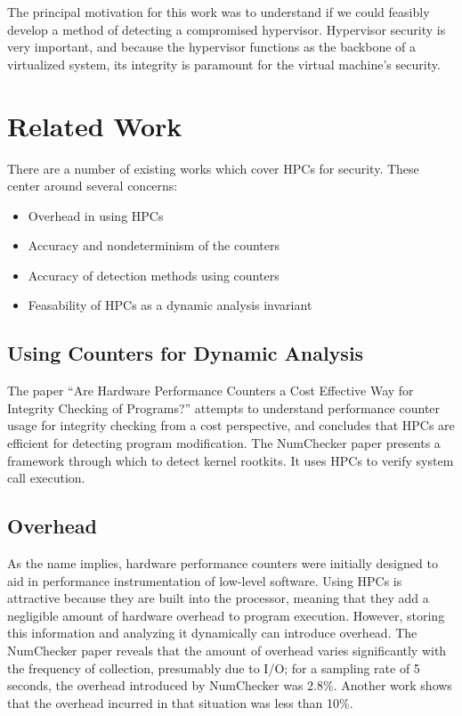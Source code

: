 \documentclass[notitlepage]{article}
\begin{document}
The principal motivation for this work was to understand if we could feasibly
develop a method of detecting a compromised hypervisor. Hypervisor security is
very important, and because the hypervisor functions as the backbone of a
virtualized system, its integrity is paramount for the virtual machine's
security.


\section{Related Work}
\label{sec:related}
There are a number of existing works which cover HPCs for security. These center
around several concerns:
\begin{itemize}
    \item Overhead in using HPCs
    \item Accuracy and nondeterminism of the counters
    \item Accuracy of detection methods using counters
    \item Feasability of HPCs as a dynamic analysis invariant
\end{itemize}

\subsection{Using Counters for Dynamic Analysis}
The paper ``Are Hardware Performance Counters a Cost Effective Way for Integrity
Checking of Programs?'' attempts to understand performance counter usage for
integrity checking from a cost perspective, and concludes that HPCs are
efficient for detecting program modification\cite{arehardware}. The
NumChecker\cite{numchecker} paper presents a framework through which to detect
kernel rootkits. It uses HPCs to verify system call execution.

\subsection{Overhead}
As the name implies, hardware performance counters were initially designed to
aid in performance instrumentation of low-level software. Using HPCs is
attractive because they are built into the processor, meaning that they add a
negligible amount of hardware overhead to program execution. However, storing
this information and analyzing it dynamically can introduce overhead. The
NumChecker\cite{numchecker} paper reveals that the amount of overhead varies
significantly with the frequency of collection,  presumably due to I/O; for a
sampling rate of 5 seconds, the overhead introduced by NumChecker was
2.8\%\cite{numchecker}. Another work shows that the overhead incurred in that
situation was less than 10\%\cite{arehardware}.
\end{document}
